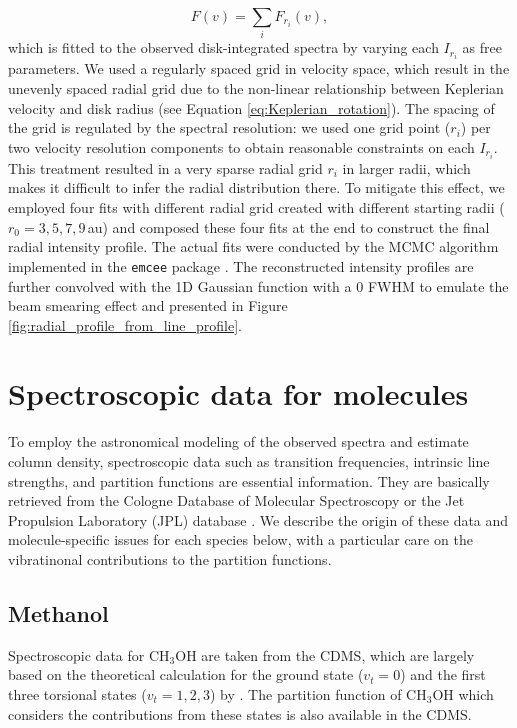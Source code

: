 \documentclass[linenumbers, twocolumn, twocolappendix, astrosymb, times]{aastex631}
\newcommand{\methanol}{CH$_3$OH\xspace}
\begin{document}
\begin{equation}
    F(v) = \sum_i F_{r_i}(v),
\end{equation}
which is fitted to the observed disk-integrated spectra by varying each $I_{r_i}$ as free parameters. We used a regularly spaced grid in velocity space, which result in the unevenly spaced radial grid due to the non-linear relationship between Keplerian velocity and disk radius (see Equation \ref{eq:Keplerian_rotation}). The spacing of the grid is regulated by the spectral resolution: we used one grid point ($r_i$) per two velocity resolution components to obtain reasonable constraints on each $I_{r_i}$. This treatment resulted in a very sparse radial grid $r_i$ in larger radii, which makes it difficult to infer the radial distribution there. To mitigate this effect, we employed four fits with different radial grid created with different starting radii ($r_0 = 3, 5, 7, 9$\,au) and composed these four fits at the end to construct the final radial intensity profile. The actual fits were conducted by the MCMC algorithm implemented in the \texttt{emcee} package \citep{emcee}. The reconstructed intensity profiles are further convolved with the 1D Gaussian function with a 0 FWHM to emulate the beam smearing effect and presented in Figure \ref{fig:radial_profile_from_line_profile}.      

\section{Spectroscopic data for molecules}\label{appendix:spectroscopic_data}
To employ the astronomical modeling of the observed spectra and estimate column density, spectroscopic data such as transition frequencies, intrinsic line strengths, and partition functions are essential information. They are basically retrieved from the Cologne
Database of Molecular Spectroscopy \citep[CDMS;][]{CDMS1, CDMS2, CDMS3} or the Jet Propulsion Laboratory (JPL) database \citep{JPL}. We describe the origin of these data and molecule-specific issues for each species below, with a particular care on the vibratinonal contributions to the partition functions. 

\subsection{Methanol}\label{appendix:specdata_methanol}
Spectroscopic data for \methanol are taken from the CDMS, which are largely based on the theoretical calculation for the ground state ($v_t = 0$) and the first three torsional states ($v_t = 1, 2, 3$) by \citet{Xu2008}. The partition function of \methanol which considers the contributions from these states is also available in the CDMS. 
\end{document}

